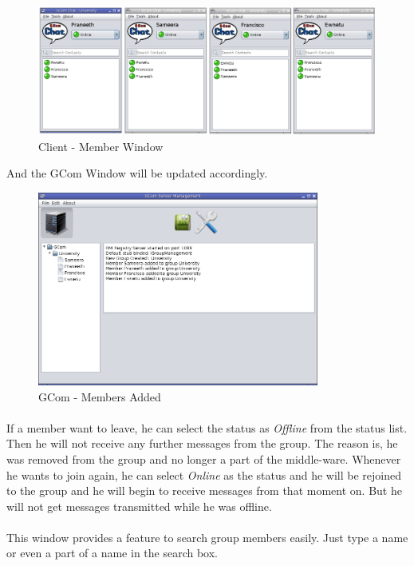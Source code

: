 \documentclass[a4paper,english,twoside]{article}
\begin{document}
\begin{figure}[h]
\begin{center}
\includegraphics[width=490px]{Client-Chats.png}
\caption{Client - Member Window}
\end{center}
\end{figure}

\noindent
And the GCom Window will be updated accordingly.
\begin{figure}[h]
\begin{center}
\includegraphics[width=350px]{GCom-MembersAdded.png}
\caption{GCom - Members Added}
\end{center}
\end{figure}

\paragraph{}
If a member want to leave, he can select the status as \textit{Offline} from the status list. Then he will not receive any further messages from the group. The reason is, he was removed from the group and no longer a part of the middle-ware. Whenever he wants to join again, he can select \textit{Online} as the status and he will be rejoined to the group and he will begin to receive messages from that moment on. But he will not get messages transmitted while he was offline.

\paragraph{}
This window provides a feature to search group members easily. Just type a name or even a part of a name in the search box.
\end{document}
